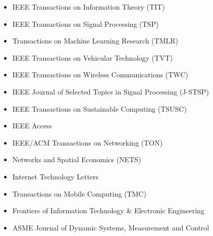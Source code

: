 \documentclass[10pt,letter]{article}
\begin{document}
\begin{small}
\begin{itemize}
\begin{itemize}[itemsep=1pt]
            \item IEEE Transactions on Information Theory (TIT)

            \item IEEE Transactions on Signal Processing (TSP)
 
	    \item Transactions on Machine Learning Research (TMLR)
	    \item IEEE Transactions on Vehicular Technology (TVT)
	    \item IEEE Transactions on Wireless Communications (TWC)
            \item IEEE Journal of Selected Topics in Signal Processing (J-STSP)
	    \item IEEE Transactions on Sustainable Computing (TSUSC)
	    \item IEEE Access
            \item IEEE/ACM Transactions on Networking (TON)
	    \item Networks and Spatial Economics (NETS)
	    \item Internet Technology Letters
	    \item Transactions on Mobile Computing (TMC)
	    \item Frontiers of Information Technology \& Electronic Engineering
        \item ASME Journal of Dynamic Systems, Measurement and Control
	\end{itemize}
	
	
	


\end{itemize}
\end{small}
\end{document}
